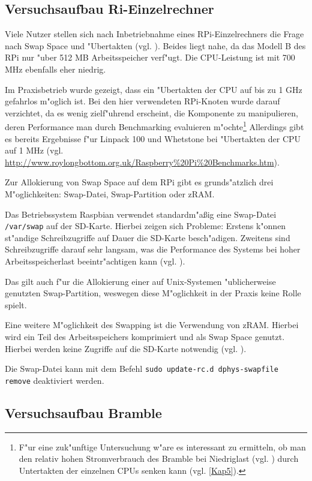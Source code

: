 \subsection{Versuchsaufbau Ri-Einzelrechner}\label{RPi-Versuchsaufbau}

Viele Nutzer stellen sich nach Inbetriebnahme eines RPi-Einzelrechners die Frage nach Swap Space und "Ubertakten (vgl. \cite{pow12}). Beides liegt nahe, da das Modell B des RPi nur "uber 512 MB Arbeitsspeicher verf"ugt. Die CPU-Leistung ist mit 700 MHz ebenfalls eher niedrig. 

Im Praxisbetrieb wurde gezeigt, dass ein "Ubertakten der CPU auf bis zu 1 GHz gefahrlos m"oglich ist. Bei den hier verwendeten RPi-Knoten wurde darauf verzichtet, da es wenig zielf"uhrend erscheint, die Komponente zu manipulieren, deren Performance man durch Benchmarking evaluieren m"ochte\footnote{F"ur eine zuk"unftige Untersuchung w"are es interessant zu ermitteln, ob man den relativ hohen Stromverbrauch des Bramble bei Niedriglast (vgl. \cite{kli13}) durch Untertakten der einzelnen CPUs senken kann (vgl. \ref{Kap5}).} Allerdings gibt es bereits Ergebnisse f"ur Linpack 100 und Whetstone bei "Ubertakten der CPU auf 1 MHz (vgl. \url{http://www.roylongbottom.org.uk/Raspberry\%20Pi\%20Benchmarks.htm}).

Zur Allokierung von Swap Space auf dem RPi gibt es grunds"atzlich drei M"oglichkeiten: Swap-Datei, Swap-Partition oder zRAM. 

Das Betriebssystem Raspbian verwendet standardm"a\ss ig eine Swap-Datei \texttt{/var/swap} auf der SD-Karte. Hierbei zeigen sich Probleme: Erstens k"onnen st"andige Schreibzugriffe auf Dauer die SD-Karte besch"adigen. Zweitens sind Schreibzugriffe darauf sehr langsam, was die Performance des Systems bei hoher Arbeitsspeicherlast beeintr"achtigen kann (vgl. \cite{pow12}). 

Das gilt auch f"ur die Allokierung einer auf Unix-Systemen "ublicherweise genutzten Swap-Partition, weswegen diese M"oglichkeit in der Praxis keine Rolle spielt. 

Eine weitere M"oglichkeit des Swapping ist die Verwendung von zRAM. Hierbei wird ein Teil des Arbeitsspeichers komprimiert und als Swap Space genutzt. Hierbei werden keine Zugriffe auf die SD-Karte notwendig (vgl. \cite{pow12}). 

Die Swap-Datei kann mit dem Befehl \texttt{sudo update-rc.d dphys-swapfile remove} deaktiviert werden. 

\subsection{Versuchsaufbau Bramble}\label{Bramble-Versuchsaufbau}

